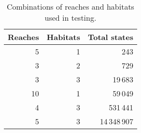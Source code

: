 \begin{table}[H]
\centering
\caption{Combinations of reaches and habitats used in testing.}
\label{tab:reaches_habitats}
\begin{tabular}{rrr}
 \toprule
 Reaches & Habitats & Total states \\
 \midrule
 5  & 1 &          243 \\
 3  & 2 &          729 \\
 3  & 3 &      19\,683 \\
 10 & 1 &      59\,049 \\
 4  & 3 &     531\,441 \\
 5  & 3 & 14\,348\,907 \\
 \bottomrule
\end{tabular}
\end{table}